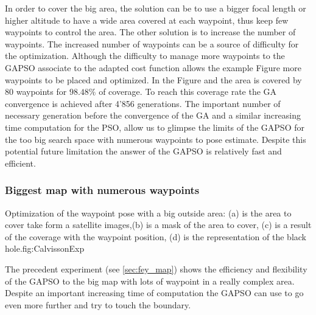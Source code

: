 In order to cover the big area, the solution can be to use a bigger focal length or higher altitude to have a wide area covered at each waypoint, thus keep few waypoints to control the area. The other solution is to increase the number of waypoints. The increased number of waypoints can be a source of difficulty for the  optimization. Although the difficulty to manage more waypoints  to the GAPSO associate to the adapted cost function allows the example Figure  more waypoints to be placed and optimized. 
 In the Figure  and  the area is covered by 80 waypoints for $98.48\%$ of coverage. To reach this coverage rate the GA convergence is achieved after 4'856 generations. The important number of necessary generation before the convergence of the GA and a similar  increasing time computation for the PSO, allow us to glimpse the limits of the GAPSO for the too big search space with numerous waypoints to pose estimate. Despite this potential future limitation the answer of the GAPSO is relatively fast and efficient.\\
 

		\subsubsection{Biggest map with numerous waypoints}
\begin{mfigures}[!]{ Optimization of the waypoint pose with a big outside area: (a) is the area to cover take form a satellite images,(b) is a mask of the area to cover, (c) is a result of the coverage with the waypoint position, (d) is the representation of the black hole.}{fig:CalvissonExp} \centering
{}
\hspace{1cm}
\hspace{1cm}
\tabsimuposeCalvisson
\end{mfigures}	

The precedent experiment (see \ref{sec:fey_map}) shows the efficiency and flexibility of the GAPSO to the big map with lots of waypoint in a really complex area. Despite an important increasing time of computation the GAPSO can use to go even more further and try to touch the boundary.  

